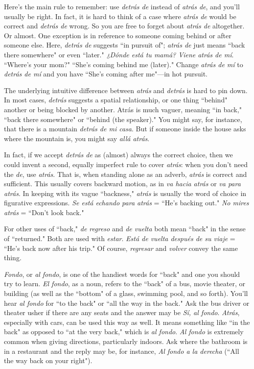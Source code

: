 Here's the main rule to remember: use \emph{detrás de} instead of
\emph{atrás de}, and you'll usually be right. In fact, it is hard to think of a case
where \emph{atrás de} would be correct and \emph{detrás de} wrong. So you are free
to forget about \emph{atrás de} altogether. Or almost. One exception is in reference to someone coming behind or after someone else. Here, \emph{detrás
de} suggests ``in pursuit of"; \emph{atrás de} just means ``back there somewhere" or even ``later." \emph{¿Dónde está tu mamá? Viene atrás de mí}.
``Where's your mom?" ``She's coming behind me (later)." Change \emph{atrás
de mí} to \emph{detrás de mí} and you have ``She's coming after me"---in
hot pursuit.

The underlying intuitive difference between \emph{atrás} and \emph{detrás}
is hard to pin down. In most cases, \emph{detrás} suggests a spatial relationship, or one thing ``behind" another or being blocked by another. Atrás
is much vaguer, meaning ``in back," ``back there somewhere" or ``behind (the speaker)." You might say, for instance, that there is a mountain \emph{detrás de mi casa}. But if someone inside the house asks where the
mountain is, you might say \emph{allá atrás}.

In fact, if we accept \emph{detrás de} as (almost) always the correct
choice, then we could invent a second, equally imperfect rule to cover
\emph{atrás}: when you don't need the \emph{de}, use \emph{atrás}. That is, when standing
alone as an adverb, \emph{atrás} is correct and sufficient. This usually covers
backward motion, as in \emph{va hacia atrás} or \emph{va para atrás}. In keeping
with its vague ``backness," \emph{atrás} is usually the word of choice in figurative expressions. \emph{Se está echando para atrás} = ``He's backing out."
\emph{No mires atrás} = ``Don't look back."

For other uses of ``back," \emph{de regreso} and \emph{de vuelta} both mean
``back" in the sense of ``returned." Both are used with \emph{estar}. \emph{Está de
vuelta después de su viaje} = ``He's back now after his trip." Of course,
\emph{regresar} and \emph{volver} convey the same thing.

\emph{Fondo}, or \emph{al fondo}, is one of the handiest words for ``back"
and one you should try to learn. \emph{El fondo}, as a noun, refers to the
``back" of a bus, movie theater, or building (as well as the ``bottom"
of a glass, swimming pool, and so forth). You'll hear \emph{al fondo} for ``to
the back" or ``all the way in the back." Ask the bus driver or theater
usher if there are any seats and the answer may be \emph{Sí, al fondo}. \emph{Atrás},
especially with cars, can be used this way as well. It means something
like ``in the back" as opposed to ``at the very back," which is \emph{al fondo}.
\emph{Al fondo} is extremely common when giving directions, particularly
indoors. Ask where the bathroom is in a restaurant and the reply may
be, for instance, \emph{Al fondo a la derecha} (``All the way back on your
right").

